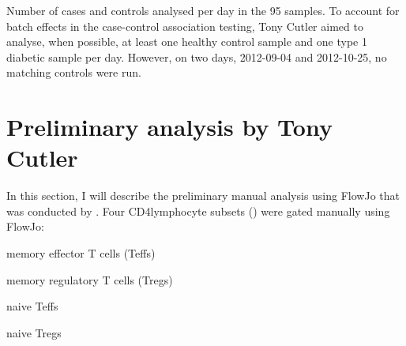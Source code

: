 { Number of cases and controls analysed per day in the 95 samples. }
{
  To account for batch effects in the case-control association testing,
  Tony Cutler aimed to analyse, when possible,
  at least one healthy control sample and one type 1 diabetic sample per day.
  However, on two days, 2012-09-04 and 2012-10-25, no matching controls were run.
}

\clearpage

\section{Preliminary analysis by Tony Cutler}

In this section, I will describe the preliminary manual analysis using FlowJo that was conducted by .
Four CD4\positive lymphocyte subsets () were gated manually using FlowJo:
\begin{itemise}
    \item memory effector T cells (Teffs)
    \item memory regulatory T cells (Tregs)
    \item naive Teffs
    \item naive Tregs
\end{itemise}

